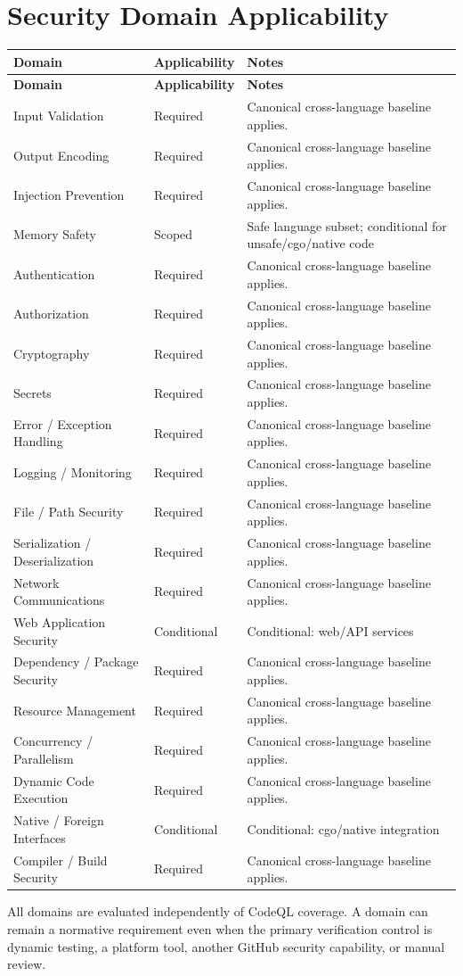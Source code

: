 \documentclass[10pt,letterpaper]{article}
\begin{document}
\section{Security Domain Applicability}
\small
\setlength{\tabcolsep}{3pt}
\begin{longtable}{@{}P{1.8in}P{0.85in}P{3.75in}@{}}
\toprule
\textbf{Domain} & \textbf{Applicability} & \textbf{Notes}\\
\midrule
\endfirsthead
\toprule
\textbf{Domain} & \textbf{Applicability} & \textbf{Notes}\\
\midrule
\endhead
Input Validation & Required & Canonical cross-language baseline applies.\\
Output Encoding & Required & Canonical cross-language baseline applies.\\
Injection Prevention & Required & Canonical cross-language baseline applies.\\
Memory Safety & Scoped & Safe language subset; conditional for unsafe/cgo/native code\\
Authentication & Required & Canonical cross-language baseline applies.\\
Authorization & Required & Canonical cross-language baseline applies.\\
Cryptography & Required & Canonical cross-language baseline applies.\\
Secrets & Required & Canonical cross-language baseline applies.\\
Error / Exception Handling & Required & Canonical cross-language baseline applies.\\
Logging / Monitoring & Required & Canonical cross-language baseline applies.\\
File / Path Security & Required & Canonical cross-language baseline applies.\\
Serialization / Deserialization & Required & Canonical cross-language baseline applies.\\
Network Communications & Required & Canonical cross-language baseline applies.\\
Web Application Security & Conditional & Conditional: web/API services\\
Dependency / Package Security & Required & Canonical cross-language baseline applies.\\
Resource Management & Required & Canonical cross-language baseline applies.\\
Concurrency / Parallelism & Required & Canonical cross-language baseline applies.\\
Dynamic Code Execution & Required & Canonical cross-language baseline applies.\\
Native / Foreign Interfaces & Conditional & Conditional: cgo/native integration\\
Compiler / Build Security & Required & Canonical cross-language baseline applies.\\
\bottomrule
\end{longtable}
\normalsize
All domains are evaluated independently of CodeQL coverage. A domain can remain a normative requirement even when the primary verification control is dynamic testing, a platform tool, another GitHub security capability, or manual review.
\end{document}

